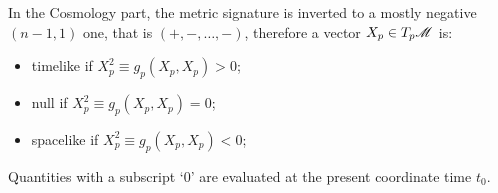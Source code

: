 
In the Cosmology part, the metric signature is inverted to a mostly negative $ (n-1 , 1) $ one, that is $ (+ , - , \dots , -) $, therefore a vector $ X_p \in T_p\mathscr{M} $ is:
\begin{itemize}
  \item timelike if $ X_p^2 \equiv g_p(X_p , X_p) > 0 $;
  \item null if $ X_p^2 \equiv g_p(X_p , X_p) = 0 $;
  \item spacelike if $ X_p^2 \equiv g_p(X_p , X_p) < 0 $;
\end{itemize}

Quantities with a subscript `0' are evaluated at the present coordinate time $ t_0 $.
